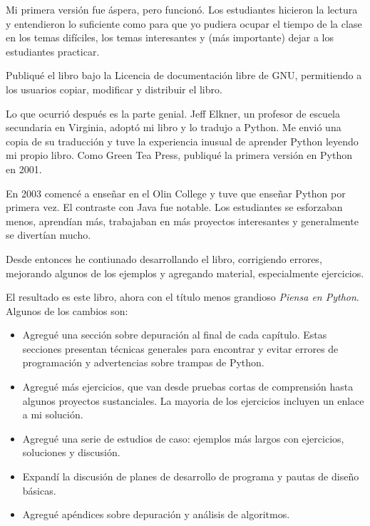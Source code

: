 \documentclass[10pt]{book}
\begin{document}
Mi primera versión fue áspera, pero funcionó.  Los estudiantes hicieron la
lectura y entendieron lo suficiente como para que yo pudiera ocupar el tiempo
de la clase en los temas difíciles, los temas interesantes y (más importante)
dejar a los estudiantes practicar.

Publiqué el libro bajo la Licencia de documentación libre de GNU,
permitiendo a los usuarios copiar, modificar y distribuir el libro.

Lo que ocurrió después es la parte genial.  Jeff Elkner, un profesor
de escuela secundaria en Virginia, adoptó mi libro y lo tradujo a Python.
Me envió una copia de su traducción y tuve la experiencia inusual de
aprender Python leyendo mi propio libro. Como Green Tea Press,
publiqué la primera versión en Python en 2001.

En 2003 comencé a enseñar en el Olin College y tuve que enseñar Python
por primera vez.  El contraste con Java fue notable.
Los estudiantes se esforzaban menos, aprendían más, trabajaban en más
proyectos interesantes y generalmente se divertían mucho.

Desde entonces he contiunado desarrollando el libro,
corrigiendo errores, mejorando algunos de los ejemplos y agregando material,
especialmente ejercicios.

El resultado es este libro, ahora con el título menos grandioso
{\em Piensa en Python}.  Algunos de los cambios son:

\begin{itemize}

\item Agregué una sección sobre depuración al final de cada capítulo.
  Estas secciones presentan técnicas generales para encontrar y evitar
  errores de programación y advertencias sobre trampas de Python.

\item Agregué más ejercicios, que van desde pruebas cortas de comprensión
  hasta algunos proyectos sustanciales.  La mayoria de los ejercicios
  incluyen un enlace a mi solución.

\item Agregué una serie de estudios de caso: ejemplos más largos con
  ejercicios, soluciones y discusión.

\item Expandí la discusión de planes de desarrollo de programa y
  pautas de diseño básicas.

\item Agregué apéndices sobre depuración y análisis de algoritmos.

\end{itemize}
\end{document}
